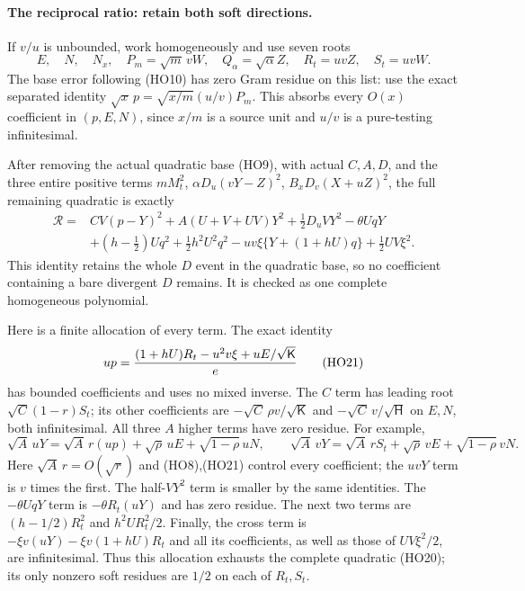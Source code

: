 \paragraph{The reciprocal ratio: retain both soft directions.}
If $v/u$ is unbounded, work homogeneously and use seven roots
\[
 E,\quad N,\quad N_x,\quad
 P_m=\sqrt m\,vW,\quad Q_\alpha=\sqrt\alpha Z,\quad
 R_t=uvZ,\quad S_t=uvW .
 \tag{HO19}
\]
The base error following (HO10) has zero Gram residue on this list:
use the exact separated identity
$\sqrt x\,p=\sqrt{x/m}(u/v)P_m$.
This absorbs every $O(x)$ coefficient in $(p,E,N)$, since $x/m$
is a source unit and $u/v$ is a pure-testing infinitesimal.

After removing the actual quadratic base (HO9), with actual $C,A,D$,
and the three entire positive terms
$mM_t^2$, $\alpha D_u(vY-Z)^2$,
$B_xD_v(X+uZ)^2$, the full remaining quadratic is exactly
\[
 \begin{split}
 \mathcal R={}&CV(p-Y)^2+A(U+V+UV)Y^2
                      +\tfrac12D_uVY^2-\theta UqY\\
 &+(h-\tfrac12)Uq^2+\tfrac12h^2U^2q^2
       -uv\xi\{Y+(1+hU)q\}+\tfrac12UV\xi^2 .
 \end{split}
 \tag{HO20}
\]
This identity retains the whole $D$ event in the quadratic base,
so no coefficient containing a bare divergent $D$ remains.
It is checked as one complete homogeneous polynomial.

Here is a finite allocation of every term. The exact identity
\[
 up={(1+hU)R_t-u^2v\xi+uE/\sqrt{\mathsf K}\over e}
 \tag{HO21}
\]
has bounded coefficients and uses no mixed inverse.
The $C$ term has leading root
$\sqrt C(1-r)S_t$; its other coefficients are
$-\sqrt C\,\rho v/\sqrt{\mathsf K}$ and
$-\sqrt C\,v/\sqrt{\mathsf H}$ on $E,N$, both infinitesimal.
All three $A$ higher terms have zero residue. For example,
\[
 \sqrt A\,uY=\sqrt A\,r(up)+\sqrt\rho\,uE+
                               \sqrt{1-\rho}\,uN,\qquad
 \sqrt A\,vY=\sqrt A\,rS_t+\sqrt\rho\,vE+
                               \sqrt{1-\rho}\,vN .
 \tag{HO22}
\]
Here $\sqrt A\,r=O(\sqrt r)$ and (HO8),(HO21)
control every coefficient; the $uvY$ term is $v$ times the first.
The half-$VY^2$ term is smaller by the same identities.
The $-\theta UqY$ term is $-\theta R_t(uY)$ and has zero residue.
The next two terms are $(h-1/2)R_t^2$ and
$h^2U R_t^2/2$.
Finally, the cross term is
$-\xi v(uY)-\xi v(1+hU)R_t$ and all its coefficients,
as well as those of $UV\xi^2/2$, are infinitesimal.
Thus this allocation exhausts the complete quadratic (HO20);
its only nonzero soft residues are $1/2$ on each of $R_t,S_t$.

